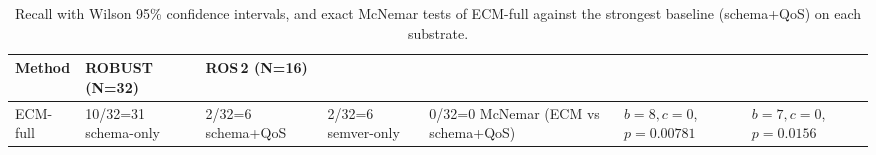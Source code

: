 \begin{table}[!ht]\centering
\caption{Recall with Wilson 95\% confidence intervals, and exact McNemar tests of ECM-full against the strongest baseline (schema+QoS) on each substrate.}
\label{tab:pathb_stats}\small
\begin{tabularx}{\linewidth}{@{}lXX@{}}
\toprule
\textbf{Method} & \textbf{ROBUST (N=32)} & \textbf{ROS\,2 (N=16)} \\
\midrule
ECM-full & 10/32=31%
schema-only & 2/32=6%
schema+QoS & 2/32=6%
semver-only & 0/32=0%
\midrule
McNemar (ECM vs schema+QoS) & $b{=}8, c{=}0$, $p{=}0.00781$ & $b{=}7, c{=}0$, $p{=}0.0156$ \\
\bottomrule
\end{tabularx}
\end{table}